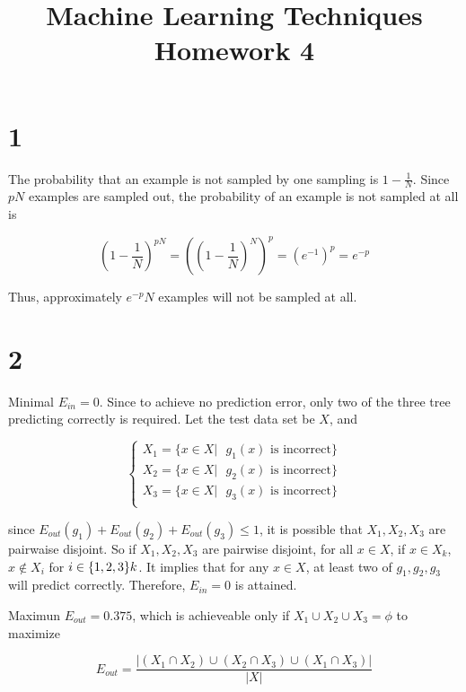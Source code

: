 \documentclass[fleqn,a4paper,12pt]{article}
\title{Machine Learning Techniques Homework 4}
\date{}
\begin{document}
\maketitle
\thispagestyle{fancy}

\section*{1}

The probability that an example is not sampled by one sampling is $1 - \frac{1}{N}$. Since $pN$ examples are sampled out, the probability of an example is not sampled at all is

\begin{equation*}
  (1 - \frac{1}{N})^{pN} = ((1 - \frac{1}{N})^{N})^{p} = (e^{-1})^{p} = e^{-p}
\end{equation*}

Thus, approximately $e^{-p} N$ examples will not be sampled at all.

\section*{2}

Minimal $E_{in} = 0$. Since to achieve no prediction error, only two of the three tree predicting correctly is required. Let the test data set be $X$, and

\begin{equation*}
  \begin{cases}
    X_1 = \{ x \in X | \text{ $g_1(x)$ is incorrect} \} \\
    X_2 = \{ x \in X | \text{ $g_2(x)$ is incorrect} \} \\
    X_3 = \{ x \in X | \text{ $g_3(x)$ is incorrect} \} \\
  \end{cases}
\end{equation*}

since $E_{out}(g_1) + E_{out}(g_2) + E_{out}(g_3) \le 1$, it is possible that $X_1, X_2, X_3$ are pairwaise disjoint. So if $X_1, X_2, X_3$ are pairwise disjoint, for all $x \in X$, if $x \in X_k$, $x \notin X_{i}$ for $i \in \{1, 2, 3\} \\k$. It implies that for any $x \in X$, at least two of $g_1, g_2, g_3$ will predict correctly. Therefore, $E_{in} = 0$ is attained.

Maximun $E_{out} = 0.375$, which is achieveable only if $X_1 \cup X_2 \cup X_3 = \phi$ to maximize

\begin{equation*}
  E_{out} = \frac{|(X_1 \cap X_2) \cup (X_2 \cap X_3) \cup (X_1 \cap X_3)|}{|X|}
\end{equation*}
\end{document}
